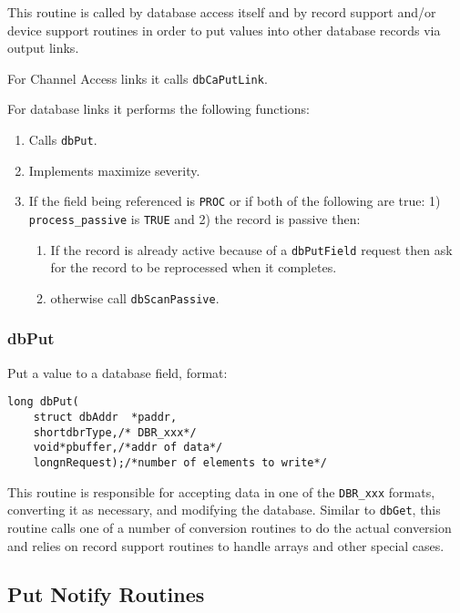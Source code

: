This routine is called by database access itself and by record support and/or device support routines in order to put values 
into other database records via output links.

For Channel Access links it calls \verb|dbCaPutLink|.

For database links it performs the following functions:

\begin{enumerate}
\item Calls \verb|dbPut|.

\item Implements maximize severity.

\item If the field being referenced is \verb|PROC| or if both of the following are true: 1) \verb|process_passive| is \verb|TRUE| and 2) the record is passive then:

\begin{enumerate}

\item If the record is already active because of a \verb|dbPutField| request then ask for the record to be reprocessed when it completes.

\item otherwise call \verb|dbScanPassive|.

\end{enumerate}
\end{enumerate}

\subsubsection{dbPut}

Put a value to a database field, format:

\begin{verbatim}
long dbPut(
    struct dbAddr  *paddr,
    shortdbrType,/* DBR_xxx*/
    void*pbuffer,/*addr of data*/
    longnRequest);/*number of elements to write*/
\end{verbatim}

This routine is responsible for accepting data in one of the \verb|DBR_xxx| formats, converting it as necessary, and modifying 
the database. Similar to \verb|dbGet|, this routine calls one of a number of conversion routines to do the actual conversion and 
relies on record support routines to handle arrays and other special cases.

\subsection{Put Notify Routines}

